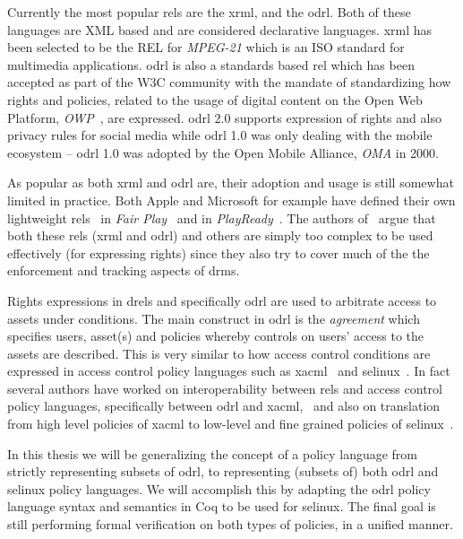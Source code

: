 Currently the most popular \ac{rel}s are the \ac{xrml}, and the \ac{odrl}. Both of these languages are XML based and are considered declarative languages. \ac{xrml} has been selected to be the REL for \emph{MPEG-21} which is an ISO standard for multimedia applications. \ac{odrl} is also a standards based \ac{rel} which has been accepted as part of the W3C community with the mandate of standardizing how rights and policies, related to the usage of digital content on the Open Web Platform, \emph{OWP}~\cite{openwebplatform}, are expressed. \ac{odrl} 2.0 supports expression of rights and also privacy rules for social media while \ac{odrl} 1.0 was only dealing with the mobile ecosystem -- \ac{odrl} 1.0 was adopted by the Open Mobile Alliance, \emph{OMA} in 2000.

As popular as both \ac{xrml} and \ac{odrl} are, their adoption and usage is still somewhat limited in practice. Both Apple and Microsoft for example have defined their own lightweight \ac{rel}s~\cite{problemwithrels} in \emph{Fair Play}~\cite{fairplay} and in \emph{PlayReady}~\cite{playready}. The authors of~\cite{problemwithrels} argue that both these \ac{rel}s (\ac{xrml} and \ac{odrl}) and others are simply too complex to be used effectively (for expressing rights) since they also try to cover much of the the enforcement and tracking aspects of \ac{drm}s.

Rights expressions in \ac{drel}s and specifically \ac{odrl} are used to arbitrate access to assets under conditions. The main construct in \ac{odrl} is the \emph{agreement} which specifies users, asset(s) and policies whereby controls on users' access to the assets are described. This is very similar to how access control conditions are expressed in access control policy languages such as \ac{xacml}~\cite{xacml} and \ac{selinux}~\cite{selinux}. In fact several authors have worked on interoperability between \ac{rel}s and access control policy languages, specifically between \ac{odrl} and \ac{xacml},~\cite{prados2005interoperability, maronas2009architecture} and also on translation from high level policies of \ac{xacml} to low-level and fine grained policies of \ac{selinux}~\cite{alam2008usage}. 

In this thesis we will be generalizing the concept of a policy language from strictly representing subsets of \ac{odrl}, to representing (subsets of) both \ac{odrl} and \ac{selinux} policy languages. We will accomplish this by adapting the \ac{odrl} policy language syntax and semantics in Coq to be used for \ac{selinux}. The final goal is still performing formal verification on both types of policies, in a unified manner.



